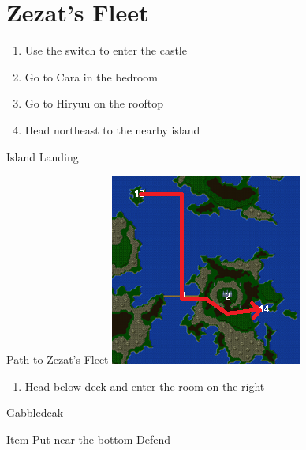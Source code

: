 \chapter{Zezat's Fleet}

\vspace{\baselineskip}

\begin{paracol}{2}

\begin{enumerate}
    \item Use the switch to enter the castle
    \item Go to Cara in the bedroom
    \item Go to Hiryuu on the rooftop
    \item Head northeast to the nearby island
\end{enumerate}

\switchcolumn
\begin{steproute}{Island Landing}
\end{steproute}

\begin{misc}{Path to Zezat's Fleet}
    \includegraphics[scale=0.7]{../Graphics/Maps/11. To Zezat's Fleet.png}
\end{misc}

\switchcolumn*
\vspace{-5.685cm}
\begin{enumerate}[resume]
    \item Head below deck and enter the room on the right
\end{enumerate}

\begin{boss}{Gabbledeak}
	\varwb
    \begin{notes}
        \item {}
    \end{notes}
	\begin{round}{1}
		\faris Item \then \unequip{\kunai} \then Put near the bottom \then {}
        \galuf Defend
        \bartz \leftCommand{\gilToss}
	\end{round}
	\varwe
\end{boss}


\end{paracol}
